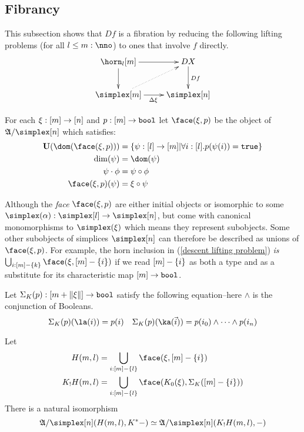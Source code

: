 \subsection{Fibrancy}
This subsection shows that $Df$ is a fibration by reducing the following lifting problems (for all $l\leq m\of\nno$) to ones that involve $f$ directly.
\begin{equation}
	\xymatrix{
		\horn_l[m]\ar[r]\ar[d] & DX\ar[d]^{Df} \\
		\simplex[m]\ar[r]_{\Delta\xi} \ar@{.>}[ur] & \simplex[n]
	}
	\label{descent lifting problem}
\end{equation}


\begin{definition} For each $\xi:[m]\to[n]$ and $p:[m]\to\mathtt{bool}$ let $\face(\xi,p)$ be the object of $\ambient/\simplex[n]$ which satisfies: 
\begin{align*}
\base(\dom(\face(\xi,p))) &= \set{\psi\of[l]\to[m]| \forall i\of[l].p(\psi(i))=\true}\\
\dim(\psi) &= \dom(\psi) \\
\psi\cdot\phi &= \psi\circ\phi\\
\face(\xi,p)(\psi) &= \xi\circ\psi
\end{align*}
\end{definition}

Although the \emph{face} $\face(\xi,p)$ are either initial objects or isomorphic to some $\simplex(\alpha)\of\simplex[l]\to\simplex[n]$, but come with canonical monomorphisms to $\simplex(\xi)$ which means they represent subobjects. Some other subobjects of simplices $\simplex[n]$ can therefore be described as unions of $\face(\xi,p)$. For example, the horn inclusion in (\ref{descent lifting problem}) \emph{is} $\bigcup_{i\of [m]-\set k} \face(\xi,[m]-\set i)$ if we read $[m]-\left\{i\right\}$ as both a type and as a substitute for its characteristic map $[m]\to\mathtt{bool}$.


\begin{proposition}
Let $\Sigma_ K(p): [m+\Vert \xi \Vert]\to \mathtt{bool}$ satisfy the following equation--here $\mathord\land$ is the conjunction of Booleans.
\[ \depsum K(p)(\la(i))=p(i)\quad\depsum K(p)(\ka(\vec i)) = p(i_0)\land\dotsm\land p(i_n) \] 

Let \begin{align*}
H(m,l)&=\bigcup_{i\of [m]-\set l} \face(\xi,[m]-\set i)\\
K_!H(m,l)&=\bigcup_{i\of [m]-\set l} \face(K_0(\xi),\depsum K([m]-\set i))
\end{align*}
There is a natural isomorphism \[ \ambient/\simplex[n](H(m,l),K\ri -) \simeq \ambient/\simplex[n](K_!H(m,l),-) \] \label{K-universal}
\end{proposition}


